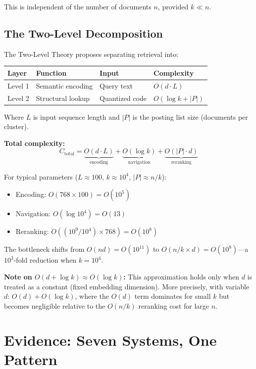 \documentclass[manuscript,screen,nonacm]{acmart}
\begin{document}
This is independent of the number of documents $n$, provided $k \ll n$.

\subsection{The Two-Level Decomposition}

The Two-Level Theory proposes separating retrieval into:

\begin{center}
\begin{tabular}{llll}
\toprule
\textbf{Layer} & \textbf{Function} & \textbf{Input} & \textbf{Complexity} \\
\midrule
Level 1 & Semantic encoding & Query text & $O(d \cdot L)$ \\
Level 2 & Structural lookup & Quantized code & $O(\log k + |P|)$ \\
\bottomrule
\end{tabular}
\end{center}

Where $L$ is input sequence length and $|P|$ is the posting list size (documents per cluster).

\textbf{Total complexity:}
\begin{equation}
C_{\text{total}} = \underbrace{O(d \cdot L)}_{\text{encoding}} + \underbrace{O(\log k)}_{\text{navigation}} + \underbrace{O(|P| \cdot d)}_{\text{reranking}}
\end{equation}

For typical parameters ($L \approx 100$, $k \approx 10^4$, $|P| \approx n/k$):
\begin{itemize}
    \item Encoding: $O(768 \times 100) = O(10^5)$
    \item Navigation: $O(\log 10^4) = O(13)$
    \item Reranking: $O((10^9/10^4) \times 768) = O(10^8)$
\end{itemize}

The bottleneck shifts from $O(nd) = O(10^{11})$ to $O(n/k \times d) = O(10^8)$---a $10^3$-fold reduction when $k = 10^4$.

\textbf{Note on $O(d + \log k) \approx O(\log k)$:} This approximation holds only when $d$ is treated as a constant (fixed embedding dimension). More precisely, with variable $d$: $O(d) + O(\log k)$, where the $O(d)$ term dominates for small $k$ but becomes negligible relative to the $O(n/k)$ reranking cost for large $n$.

\section{Evidence: Seven Systems, One Pattern}
\end{document}

